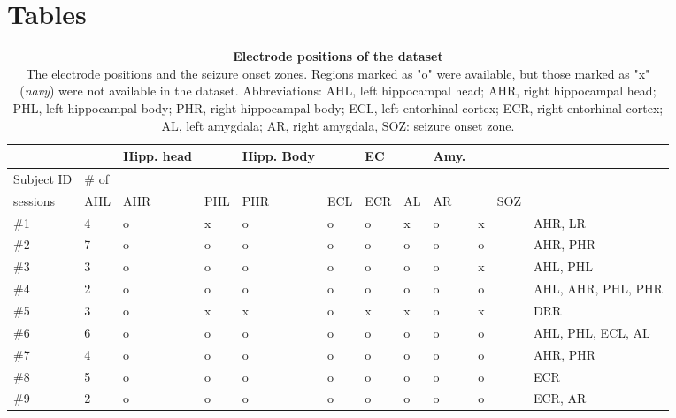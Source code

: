 \documentclass[final,3p,times,twocolumn]{elsarticle}
\begin{document}
\section*{Tables}
\label{tables}
\begin{table}[ht]
\centering
\begin{tabular}{|l|l|l|l|l|l|l|l|l|l|l|l|}
\hline
&&Hipp. head&&Hipp. Body&&EC&&Amy.&&&\\
\hline
Subject ID&\# of &&&&&&&&&&\\
\hline
sessions&AHL&AHR&PHL&PHR&ECL&ECR&AL&AR&&SOZ&\\
\hline
\#1&4&o&x&o&o&o&x&o&x&&AHR, LR\\
\hline
\#2&7&o&o&o&o&o&o&o&o&&AHR, PHR\\
\hline
\#3&3&o&o&o&o&o&o&o&x&&AHL, PHL\\
\hline
\#4&2&o&o&o&o&o&o&o&o&&AHL, AHR, PHL, PHR\\
\hline
\#5&3&o&x&x&o&x&x&o&x&&DRR\\
\hline
\#6&6&o&o&o&o&o&o&o&o&&AHL, PHL, ECL, AL\\
\hline
\#7&4&o&o&o&o&o&o&o&o&&AHR, PHR\\
\hline
\#8&5&o&o&o&o&o&o&o&o&&ECR\\
\hline
\#9&2&o&o&o&o&o&o&o&o&&ECR, AR\\
\hline
\bottomrule
\end{tabular}
\caption{\textbf{
Electrode positions of the dataset
}
\smallskip
\\
The electrode positions and the seizure onset zones. Regions marked as "o" were available, but those marked as "x" (\textit{navy}) were not available in the dataset. Abbreviations: AHL, left hippocampal head; AHR, right hippocampal head; PHL, left hippocampal body; PHR, right hippocampal body; ECL, left entorhinal cortex; ECR, right entorhinal cortex; AL, left amygdala; AR, right amygdala, SOZ: seizure onset zone.
}
\end{table}
\clearpage
{}
\end{document}
